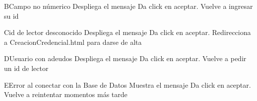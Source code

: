 	\begin{UCtrayectoriaA}{B}{Campo no númerico}
		\UCpaso[\UCsist] Despliega el mensaje 
		\UCpaso[\UCactor] Da click en aceptar.
		\UCpaso[\UCactor] Vuelve a ingresar su id
	\end{UCtrayectoriaA}
	
	\begin{UCtrayectoriaA}{C}{id de lector desconocido}
		\UCpaso[\UCsist] Despliega el mensaje 
		\UCpaso[\UCactor] Da click en aceptar.
		\UCpaso[\UCsist] Redirecciona a CreacionCredencial.html para darse de alta
	\end{UCtrayectoriaA}		
	
	\begin{UCtrayectoriaA}{D}{Usuario con adeudos}
		\UCpaso[\UCsist] Despliega el mensaje 
		\UCpaso[\UCactor] Da click en aceptar.
		\UCpaso[\UCsist] Vuelve a pedir un id de lector
	\end{UCtrayectoriaA}		

	\begin{UCtrayectoriaA}{E}{Error al conectar con la Base de Datos}
		\UCpaso[\UCsist] Muestra el mensaje 
		\UCpaso[\UCactor] Da click en aceptar.
		\UCpaso[\UCactor] Vuelve a reintentar momentos más tarde
	\end{UCtrayectoriaA}
